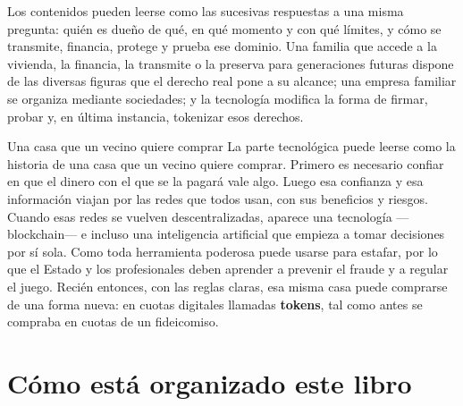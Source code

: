 \documentclass[12pt,oneside]{book}
\begin{document}
Los contenidos pueden leerse como las sucesivas respuestas a una misma pregunta: quién es dueño de qué, en qué momento y con qué límites, y cómo se transmite, financia, protege y prueba ese dominio. Una familia que accede a la vivienda, la financia, la transmite o la preserva para generaciones futuras dispone de las diversas figuras que el derecho real pone a su alcance; una empresa familiar se organiza mediante sociedades; y la tecnología modifica la forma de firmar, probar y, en última instancia, tokenizar esos derechos.

\begin{example}{Una casa que un vecino quiere comprar}
La parte tecnológica puede leerse como la historia de una casa que un vecino quiere comprar. Primero es necesario confiar en que el dinero con el que se la pagará vale algo. Luego esa confianza y esa información viajan por las redes que todos usan, con sus beneficios y riesgos. Cuando esas redes se vuelven descentralizadas, aparece una tecnología ---blockchain--- e incluso una inteligencia artificial que empieza a tomar decisiones por sí sola. Como toda herramienta poderosa puede usarse para estafar, por lo que el Estado y los profesionales deben aprender a prevenir el fraude y a regular el juego. Recién entonces, con las reglas claras, esa misma casa puede comprarse de una forma nueva: en cuotas digitales llamadas \textbf{tokens}, tal como antes se compraba en cuotas de un fideicomiso.
\end{example}

\section{Cómo está organizado este libro}
\end{document}
